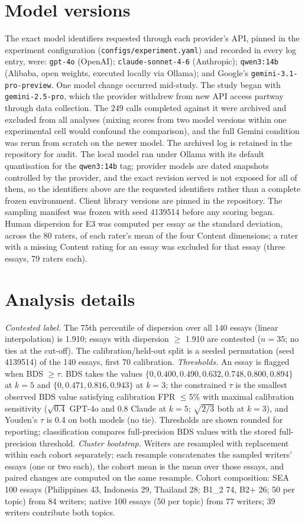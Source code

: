 \section*{Model versions}
The exact model identifiers requested through each provider's API,
pinned in the experiment configuration
(\texttt{configs/experiment.yaml}) and recorded in every log entry,
were: \texttt{gpt-4o} (OpenAI); \texttt{claude-sonnet-4-6}
(Anthropic); \texttt{qwen3:14b} (Alibaba, open weights, executed
locally via Ollama); and Google's \texttt{gemini-3.1-pro-preview}.
One model change occurred mid-study. The study began with
\texttt{gemini-2.5-pro}, which the provider withdrew from new API
access partway through data collection. The 249 calls completed
against it were archived and excluded from all analyses (mixing scores
from two model versions within one experimental cell would confound
the comparison), and the full Gemini condition was rerun from scratch
on the newer model. The archived log is retained in
the repository for audit. The local model ran under Ollama with its
default quantisation for the \texttt{qwen3:14b} tag; provider models
are dated snapshots controlled by the provider, and the exact revision
served is not exposed for all of them, so the identifiers above are
the requested identifiers rather than a complete frozen environment.
Client library versions are pinned in the repository. The sampling
manifest was frozen with seed 4139514 before any scoring began. Human
dispersion for E3 was computed per essay as the standard deviation,
across the 80 raters, of each rater's mean of the four Content
dimensions; a rater with a missing Content rating for an essay was
excluded for that essay (three essays, 79 raters each).

\section*{Analysis details}
\emph{Contested label.} The 75th percentile of dispersion over all
140 essays (linear interpolation) is 1.910; essays with dispersion
$\ge$ 1.910 are contested ($n = 35$; no ties at the cut-off). The
calibration/held-out split is a seeded permutation (seed 4139514)
of the 140 essays, first 70 calibration. \emph{Thresholds.} An
essay is flagged when BDS $\ge \tau$. BDS takes the values
$\{0, 0.400, 0.490, 0.632, 0.748, 0.800, 0.894\}$ at $k = 5$ and
$\{0, 0.471, 0.816, 0.943\}$ at $k = 3$; the constrained $\tau$
is the smallest observed BDS value satisfying calibration FPR
$\le 5\%$ with maximal calibration sensitivity ($\sqrt{0.4}$
GPT-4o and 0.8 Claude at $k = 5$; $\sqrt{2/3}$ both at $k = 3$),
and Youden's $\tau$ is 0.4 on both models (no tie). Thresholds are
shown rounded for reporting; classification compares full-precision
BDS values with the stored full-precision threshold.
\emph{Cluster bootstrap.} Writers are resampled with replacement
within each cohort separately; each resample concatenates the
sampled writers' essays (one or two each), the cohort mean is the
mean over those essays, and paired changes are computed on the same
resample. Cohort composition: SEA 100 essays (Philippines 43,
Indonesia 29, Thailand 28; B1\_2 74, B2+ 26; 50 per topic) from 84
writers; native 100 essays (50 per topic) from 77 writers; 39
writers contribute both topics.
